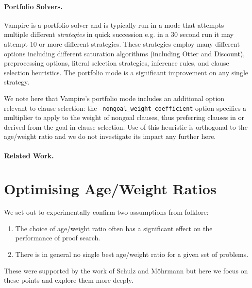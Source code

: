 \documentclass{llncs}
\newcommand{\sandm}{Schulz and M{\"{o}}hrmann}
\begin{document}
\paragraph{Portfolio Solvers.}

Vampire is a portfolio solver and is typically run in a mode that attempts multiple different \emph{strategies} in quick succession e.g. in a 30 second run it may attempt 10 or more different strategies. These strategies employ many different options including different saturation algorithms (including Otter and Discount), preprocessing options, literal selection strategies, inference rules, and clause selection heuristics. The portfolio mode is a significant improvement on any single strategy. 

We note here that Vampire's portfolio mode includes an additional option relevant to clause selection: the \texttt{--nongoal\_weight\_coefficient} option specifies a multiplier to apply to the weight of nongoal clauses, thus preferring clauses in or derived from the goal in clause selection. Use of this heuristic is orthogonal to the age/weight ratio and we do not investigate its impact any further here.

\paragraph{Related Work.} 

\newpage
\section{Optimising Age/Weight Ratios} \label{sec:awr:study}

We set out to experimentally confirm two assumptions from folklore:
\begin{enumerate}
	\item The choice of age/weight ratio often has a significant effect on the performance of proof search.
	\item There is in general no single best age/weight ratio for a given set of problems.
\end{enumerate}
These were supported by the work of \sandm{} but here we focus on these points and explore them more deeply.
\end{document}
